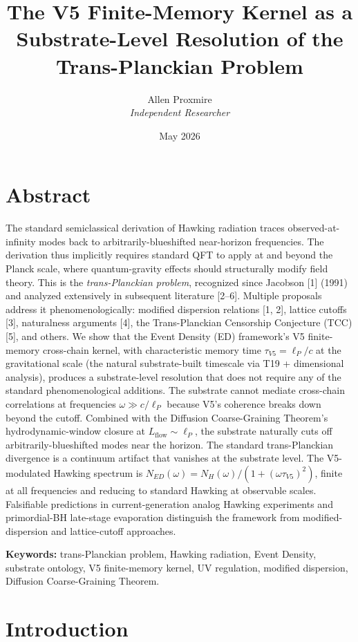 \documentclass[11pt,a4paper]{article}
\title{\vspace{-1cm}\Large\bfseries The V5 Finite-Memory Kernel as a Substrate-Level Resolution of the Trans-Planckian Problem}
\author{Allen Proxmire \\ \textit{Independent Researcher}}
\date{May 2026}
\begin{document}
\maketitle

\section*{Abstract}

The standard semiclassical derivation of Hawking radiation traces observed-at-infinity modes back to arbitrarily-blueshifted near-horizon frequencies. The derivation thus implicitly requires standard QFT to apply at and beyond the Planck scale, where quantum-gravity effects should structurally modify field theory. This is the \emph{trans-Planckian problem}, recognized since Jacobson [1] (1991) and analyzed extensively in subsequent literature [2--6]. Multiple proposals address it phenomenologically: modified dispersion relations [1, 2], lattice cutoffs [3], naturalness arguments [4], the Trans-Planckian Censorship Conjecture (TCC) [5], and others. We show that the Event Density (ED) framework's V5 finite-memory cross-chain kernel, with characteristic memory time $\tau_{V5} = \ell_P/c$ at the gravitational scale (the natural substrate-built timescale via T19 + dimensional analysis), produces a substrate-level resolution that does not require any of the standard phenomenological additions. The substrate cannot mediate cross-chain correlations at frequencies $\omega \gg c/\ell_P$ because V5's coherence breaks down beyond the cutoff. Combined with the Diffusion Coarse-Graining Theorem's hydrodynamic-window closure at $L_\mathrm{flow} \sim \ell_P$, the substrate naturally cuts off arbitrarily-blueshifted modes near the horizon. The standard trans-Planckian divergence is a continuum artifact that vanishes at the substrate level. The V5-modulated Hawking spectrum is $N_{ED}(\omega) = N_H(\omega) / (1+(\omega\tau_{V5})^{2})$, finite at all frequencies and reducing to standard Hawking at observable scales. Falsifiable predictions in current-generation analog Hawking experiments and primordial-BH late-stage evaporation distinguish the framework from modified-dispersion and lattice-cutoff approaches.

\textbf{Keywords:} trans-Planckian problem, Hawking radiation, Event Density, substrate ontology, V5 finite-memory kernel, UV regulation, modified dispersion, Diffusion Coarse-Graining Theorem.

\section{Introduction}
\end{document}
